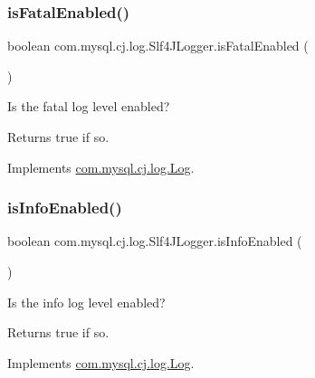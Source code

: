 \subsubsection{\texorpdfstring{is\+Fatal\+Enabled()}{isFatalEnabled()}}
{\footnotesize\ttfamily boolean com.\+mysql.\+cj.\+log.\+Slf4\+J\+Logger.\+is\+Fatal\+Enabled (\begin{DoxyParamCaption}{ }\end{DoxyParamCaption})}

Is the \textquotesingle{}fatal\textquotesingle{} log level enabled?

\begin{DoxyReturn}{Returns}
true if so. 
\end{DoxyReturn}


Implements \mbox{\hyperlink{interfacecom_1_1mysql_1_1cj_1_1log_1_1_log_a61464d2603e609442da19c59c5c62f62}{com.\+mysql.\+cj.\+log.\+Log}}.

\mbox{\label{classcom_1_1mysql_1_1cj_1_1log_1_1_slf4_j_logger_ab21b243a10ab8a46a4706658298ecd5e}} 
\subsubsection{\texorpdfstring{is\+Info\+Enabled()}{isInfoEnabled()}}
{\footnotesize\ttfamily boolean com.\+mysql.\+cj.\+log.\+Slf4\+J\+Logger.\+is\+Info\+Enabled (\begin{DoxyParamCaption}{ }\end{DoxyParamCaption})}

Is the \textquotesingle{}info\textquotesingle{} log level enabled?

\begin{DoxyReturn}{Returns}
true if so. 
\end{DoxyReturn}


Implements \mbox{\hyperlink{interfacecom_1_1mysql_1_1cj_1_1log_1_1_log_aecb7f781b61b516d6bad9ada8e7dd3aa}{com.\+mysql.\+cj.\+log.\+Log}}.

\mbox{\label{classcom_1_1mysql_1_1cj_1_1log_1_1_slf4_j_logger_afbf9106392050f7ca64b0ad7582b7517}} 
